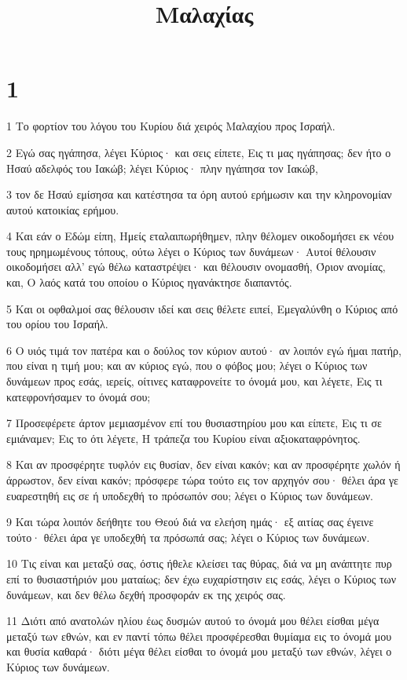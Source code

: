 

\title{Μαλαχίας}


\chapter{1}

\par 1 Το φορτίον του λόγου του Κυρίου διά χειρός Μαλαχίου προς Ισραήλ.
\par 2 Εγώ σας ηγάπησα, λέγει Κύριος· και σεις είπετε, Εις τι μας ηγάπησας; δεν ήτο ο Ησαύ αδελφός του Ιακώβ; λέγει Κύριος· πλην ηγάπησα τον Ιακώβ,
\par 3 τον δε Ησαύ εμίσησα και κατέστησα τα όρη αυτού ερήμωσιν και την κληρονομίαν αυτού κατοικίας ερήμου.
\par 4 Και εάν ο Εδώμ είπη, Ημείς εταλαιπωρήθημεν, πλην θέλομεν οικοδομήσει εκ νέου τους ηρημωμένους τόπους, ούτω λέγει ο Κύριος των δυνάμεων· Αυτοί θέλουσιν οικοδομήσει αλλ' εγώ θέλω καταστρέψει· και θέλουσιν ονομασθή, Όριον ανομίας, και, Ο λαός κατά του οποίου ο Κύριος ηγανάκτησε διαπαντός.
\par 5 Και οι οφθαλμοί σας θέλουσιν ιδεί και σεις θέλετε ειπεί, Εμεγαλύνθη ο Κύριος από του ορίου του Ισραήλ.
\par 6 Ο υιός τιμά τον πατέρα και ο δούλος τον κύριον αυτού· αν λοιπόν εγώ ήμαι πατήρ, που είναι η τιμή μου; και αν κύριος εγώ, που ο φόβος μου; λέγει ο Κύριος των δυνάμεων προς εσάς, ιερείς, οίτινες καταφρονείτε το όνομά μου, και λέγετε, Εις τι κατεφρονήσαμεν το όνομά σου;
\par 7 Προσεφέρετε άρτον μεμιασμένον επί του θυσιαστηρίου μου και είπετε, Εις τι σε εμιάναμεν; Εις το ότι λέγετε, Η τράπεζα του Κυρίου είναι αξιοκαταφρόνητος.
\par 8 Και αν προσφέρητε τυφλόν εις θυσίαν, δεν είναι κακόν; και αν προσφέρητε χωλόν ή άρρωστον, δεν είναι κακόν; πρόσφερε τώρα τούτο εις τον αρχηγόν σου· θέλει άρα γε ευαρεστηθή εις σε ή υποδεχθή το πρόσωπόν σου; λέγει ο Κύριος των δυνάμεων.
\par 9 Και τώρα λοιπόν δεήθητε του Θεού διά να ελεήση ημάς· εξ αιτίας σας έγεινε τούτο· θέλει άρα γε υποδεχθή τα πρόσωπά σας; λέγει ο Κύριος των δυνάμεων.
\par 10 Τις είναι και μεταξύ σας, όστις ήθελε κλείσει τας θύρας, διά να μη ανάπτητε πυρ επί το θυσιαστήριόν μου ματαίως; δεν έχω ευχαρίστησιν εις εσάς, λέγει ο Κύριος των δυνάμεων, και δεν θέλω δεχθή προσφοράν εκ της χειρός σας.
\par 11 Διότι από ανατολών ηλίου έως δυσμών αυτού το όνομά μου θέλει είσθαι μέγα μεταξύ των εθνών, και εν παντί τόπω θέλει προσφέρεσθαι θυμίαμα εις το όνομά μου και θυσία καθαρά· διότι μέγα θέλει είσθαι το όνομά μου μεταξύ των εθνών, λέγει ο Κύριος των δυνάμεων.
